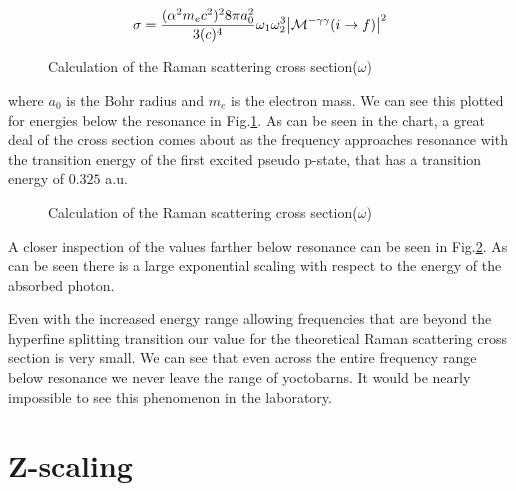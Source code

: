 \begin{equation}
    \sigma=\frac{(\alpha^2 m_e c^2)^28\pi a_0^2}{3(c)^4}\omega_1 \omega_2^3\abs{\mathcal{M}^{-\gamma\gamma}(i\rightarrow f)}^2
\end{equation}
\begin{figure}
    \centering
    \caption{Calculation of the Raman scattering cross section($\omega$)}
    \label{fig:Raman}
\end{figure}
where $a_0$ is the Bohr radius and $m_e$ is the electron mass. We can see this plotted for energies below the resonance in Fig.\ref{fig:Raman}. As can be seen in the chart, a great deal of the cross section comes about as the frequency approaches resonance with the transition energy of the first excited pseudo p-state, that has a transition energy of $0.325$ a.u.
\begin{figure}
    \centering
    \caption{Calculation of the Raman scattering cross section($\omega$)}
    \label{fig:Ramanbelowres}
\end{figure}
A closer inspection of the values farther below resonance can be seen in Fig.\ref{fig:Ramanbelowres}. As can be seen there is a large exponential scaling with respect to the energy of the absorbed photon. 

Even with the increased energy range allowing frequencies that are beyond the hyperfine splitting transition our value for the theoretical Raman scattering cross section is very small. We can see that even across the entire frequency range below resonance we never leave the range of yoctobarns. It would be nearly impossible to see this phenomenon in the laboratory.

\section{Z-scaling}

